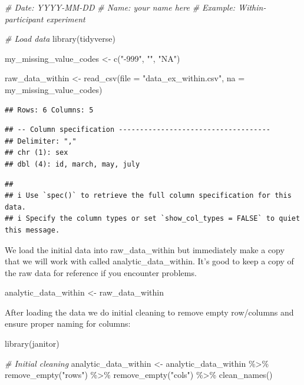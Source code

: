 \documentclass[
]{krantz}
\makeatletter
\newenvironment{Shaded}{\begin{snugshade}}{\end{snugshade}}
\newcommand{\AttributeTok}[1]{\textcolor[rgb]{0.61,0.61,0.61}{#1}}
\newcommand{\CommentTok}[1]{\textcolor[rgb]{0.37,0.37,0.37}{\textit{#1}}}
\newcommand{\FunctionTok}[1]{\textcolor[rgb]{0,0,0}{#1}}
\newcommand{\NormalTok}[1]{#1}
\newcommand{\OtherTok}[1]{\textcolor[rgb]{0.37,0.37,0.37}{#1}}
\newcommand{\SpecialCharTok}[1]{\textcolor[rgb]{0,0,0}{#1}}
\newcommand{\StringTok}[1]{\textcolor[rgb]{0.5,0.5,0.5}{#1}}
\newenvironment{kframe}{%
\medskip{}
\setlength{\fboxsep}{.8em}
 \def\at@end@of@kframe{}%
 \ifinner\ifhmode%
  \def\at@end@of@kframe{\end{minipage}}%
  \begin{minipage}{\columnwidth}%
 \fi\fi%
 \def\FrameCommand##1{\hskip\@totalleftmargin \hskip-\fboxsep
 \colorbox{shadecolor}{##1}\hskip-\fboxsep
     \hskip-\linewidth \hskip-\@totalleftmargin \hskip\columnwidth}%
 \MakeFramed {\advance\hsize-\width
   \@totalleftmargin\z@ \linewidth\hsize
   \@setminipage}}%
 {\par\unskip\endMakeFramed%
 \at@end@of@kframe}
\renewenvironment{Shaded}{\begin{kframe}}{\end{kframe}}
\makeatother
\begin{document}
\begin{Shaded}
\begin{Highlighting}[]
\CommentTok{\# Date: YYYY{-}MM{-}DD}
\CommentTok{\# Name: your name here}
\CommentTok{\# Example: Within{-}participant experiment}

\CommentTok{\# Load data}
\FunctionTok{library}\NormalTok{(tidyverse)}

\NormalTok{my\_missing\_value\_codes }\OtherTok{\textless{}{-}} \FunctionTok{c}\NormalTok{(}\StringTok{"{-}999"}\NormalTok{, }\StringTok{""}\NormalTok{, }\StringTok{"NA"}\NormalTok{)}

\NormalTok{raw\_data\_within }\OtherTok{\textless{}{-}} \FunctionTok{read\_csv}\NormalTok{(}\AttributeTok{file =} \StringTok{"data\_ex\_within.csv"}\NormalTok{,}
                     \AttributeTok{na =}\NormalTok{ my\_missing\_value\_codes)}
\end{Highlighting}
\end{Shaded}

\begin{verbatim}
## Rows: 6 Columns: 5
\end{verbatim}

\begin{verbatim}
## -- Column specification ------------------------------------
## Delimiter: ","
## chr (1): sex
## dbl (4): id, march, may, july
\end{verbatim}

\begin{verbatim}
## 
## i Use `spec()` to retrieve the full column specification for this data.
## i Specify the column types or set `show_col_types = FALSE` to quiet this message.
\end{verbatim}

We load the initial data into raw\_data\_within but immediately make a copy that we will work with called analytic\_data\_within. It's good to keep a copy of the raw data for reference if you encounter problems.

\begin{Shaded}
\begin{Highlighting}[]
\NormalTok{analytic\_data\_within }\OtherTok{\textless{}{-}}\NormalTok{ raw\_data\_within}
\end{Highlighting}
\end{Shaded}

After loading the data we do initial cleaning to remove empty row/columns and ensure proper naming for columns:

\begin{Shaded}
\begin{Highlighting}[]
\FunctionTok{library}\NormalTok{(janitor)}

\CommentTok{\# Initial cleaning}
\NormalTok{analytic\_data\_within }\OtherTok{\textless{}{-}}\NormalTok{ analytic\_data\_within }\SpecialCharTok{\%\textgreater{}\%}
  \FunctionTok{remove\_empty}\NormalTok{(}\StringTok{"rows"}\NormalTok{) }\SpecialCharTok{\%\textgreater{}\%}
  \FunctionTok{remove\_empty}\NormalTok{(}\StringTok{"cols"}\NormalTok{) }\SpecialCharTok{\%\textgreater{}\%}
  \FunctionTok{clean\_names}\NormalTok{()}
\end{Highlighting}
\end{Shaded}
\end{document}

